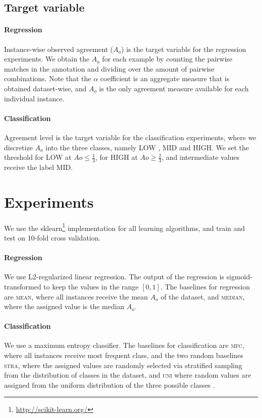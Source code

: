 \documentclass[11pt,a4paper]{article}
\begin{document}
\subsection{Target variable}
\label{sec:targetvariable}
\paragraph*{Regression} Instance-wise observed agreement ($A_o$) is the target variable for the regression experiments. We obtain  the $A_o$ for each example by counting the pairwise matches in the annotation and dividing over the amount of pairwise combinations. 
Note that the $\alpha$ coefficient is an aggregate measure that is obtained dataset-wise, and $A_o$ is the only agreement measure available for each individual instance.
\paragraph*{Classification} Agreement level is the target variable for the classification experiments, where we discretize $A_o$ into the three classes, namely LOW , MID and HIGH. We set the threshold for LOW at $Ao \le \frac{1}{3}$, for HIGH at $Ao \ge \frac{2}{3}$, and intermediate values receive the label MID.


\section{Experiments}
We use the sklearn\footnote{\url{http://scikit-learn.org/}} implementation for all learning algorithms, and train and test on 10-fold cross validation.

\paragraph*{Regression} We use L2-regularized linear regression. The output of the regression is sigmoid-transformed to keep the values in the range $[0,1]$. The baselines for regression are \textsc{mean}, where all instances receive the mean $A_o$ of the dataset, and  \textsc{median}, where the assigned value is the median $A_o$. 

\paragraph*{Classification} We use a maximum entropy classifier. The baselines for classification are \textsc{mfc}, where all instances receive most frequent class, and the two random baselines \textsc{stra}, where the assigned values are randomly selected via stratified sampling from the distribution of classes in the dataset, and \textsc{uni} where random values are assigned from the uniform distribution of the three possible classes . 
\end{document}
